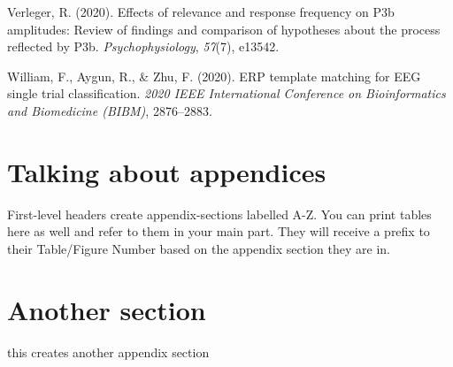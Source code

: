 \documentclass[
  man]{apa7}
\newlength{\cslhangindent}
\newlength{\cslentryspacingunit} %
\newenvironment{CSLReferences}[2] %
 {%
  \setlength{\parindent}{0pt}
  \ifodd #1
  \let\oldpar\par
  \def\par{\hangindent=\cslhangindent\oldpar}
  \fi
  \setlength{\parskip}{#2\cslentryspacingunit}
 }%
 {}
\begin{document}
\begin{CSLReferences}{1}{0}
\leavevmode{}%
Verleger, R. (2020). Effects of relevance and response frequency on {P3b} amplitudes: {Review} of findings and comparison of hypotheses about the process reflected by {P3b}. \emph{Psychophysiology}, \emph{57}(7), e13542.

\leavevmode{}%
William, F., Aygun, R., \& Zhu, F. (2020). {ERP} template matching for {EEG} single trial classification. \emph{2020 {IEEE} International Conference on Bioinformatics and Biomedicine ({BIBM})}, 2876--2883.

\end{CSLReferences}

\newpage

\hypertarget{appendix-appendix}{%
\appendix}


\hypertarget{talking-about-appendices}{%
\section{Talking about appendices}\label{talking-about-appendices}}

First-level headers create appendix-sections labelled A-Z. You can print tables here as well and refer to them in your main part. They will receive a prefix to their Table/Figure Number based on the appendix section they are in.

\hypertarget{another-section}{%
\section{Another section}\label{another-section}}

this creates another appendix section
\end{document}

